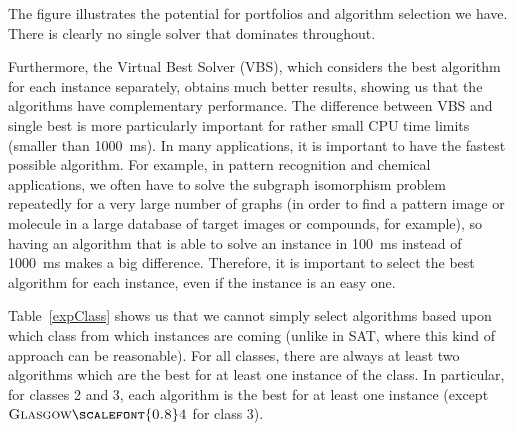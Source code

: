 \documentclass{llncs}
\newcommand{\GlasgowFour}{$\textsc{Glasgow{\scalefont{0.8}4}}$\xspace}
\begin{document}
The figure illustrates the potential for portfolios and algorithm selection we have. There is
clearly no single solver that dominates throughout.

Furthermore, the Virtual Best Solver (VBS), which considers the best algorithm for each instance
separately, obtains much better results, showing us that the algorithms have complementary
performance. The difference between VBS and single best is more particularly important for rather
small CPU time limits (smaller than \SI{1000}{\ms}). In many applications, it is important to have the
fastest possible algorithm. For example, in pattern recognition \cite{pr15,cviu11} and chemical
\cite{Giugno:2013} applications, we often have to solve the subgraph isomorphism problem repeatedly
for a very large number of graphs (in order to find a pattern image or molecule in a large database
of target images or compounds, for example), so having an algorithm that is able to solve an
instance in \SI{100}{\ms} instead of \SI{1000}{\ms} makes a big difference.  Therefore, it is important to select
the best algorithm for each instance, even if the instance is an easy one.

Table~\ref{expClass} shows us that we cannot simply select algorithms based upon which class from
which instances are coming (unlike in SAT, where this kind of approach can be reasonable). For all
classes, there are always at least two algorithms which are the best for at least one instance of
the class. In particular, for classes 2 and 3, each algorithm is the best for at least one instance
(except \GlasgowFour for class 3).
\end{document}

